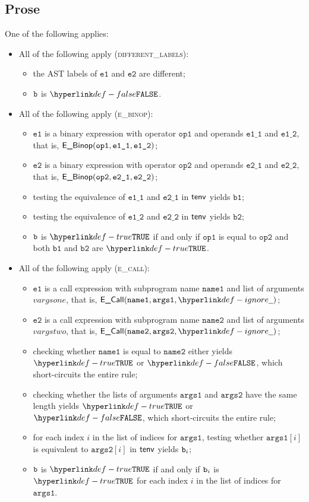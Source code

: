 \documentclass{book}
\newcommand\ProseOrTypeError[0]{\ProseTerminateAs{\TypeErrorConfig}}
\newcommand\veone[0]{\texttt{e1}}
\newcommand\vetwo[0]{\texttt{e2}}
\newcommand\opone[0]{\texttt{op1}}
\newcommand\optwo[0]{\texttt{op2}}
\newcommand\veoneone[0]{\texttt{e1\_1}}
\newcommand\veonetwo[0]{\texttt{e1\_2}}
\newcommand\vetwoone[0]{\texttt{e2\_1}}
\newcommand\vetwotwo[0]{\texttt{e2\_2}}
\newcommand\vbone[0]{\texttt{b1}}
\newcommand\vbtwo[0]{\texttt{b2}}
\newcommand\nameone[0]{\texttt{name1}}
\newcommand\nametwo[0]{\texttt{name2}}
\newcommand\vargsone[0]{\texttt{args1}}
\newcommand\vargstwo[0]{\texttt{args2}}
\begin{document}
\subsection{Prose}
One of the following applies:
\begin{itemize}
  \item All of the following apply (\textsc{different\_labels}):
  \begin{itemize}
    \item the AST labels of $\veone$ and $\vetwo$ are different;
    \item $\texttt{b}$ is $\False$.
  \end{itemize}

  \item All of the following apply (\textsc{e\_binop}):
  \begin{itemize}
    \item $\veone$ is a binary expression with operator $\opone$ and operands $\veoneone$ and $\veonetwo$,
          that is, $\EBinop(\opone, \veoneone, \veonetwo)$;
    \item $\vetwo$ is a binary expression with operator $\optwo$ and operands $\vetwoone$ and $\vetwotwo$,
          that is, $\EBinop(\optwo, \vetwoone, \vetwotwo)$;
    \item testing the equivalence of $\veoneone$ and $\vetwoone$ in $\textsf{tenv}$ yields $\vbone$\ProseOrTypeError;
    \item testing the equivalence of $\veonetwo$ and $\vetwotwo$ in $\textsf{tenv}$ yields $\vbtwo$\ProseOrTypeError;
    \item $\texttt{b}$ is $\True$ if and only if $\opone$ is equal to $\optwo$ and both $\vbone$ and $\vbtwo$ are $\True$.
  \end{itemize}

  \item All of the following apply (\textsc{e\_call}):
  \begin{itemize}
    \item $\veone$ is a call expression with subprogram name $\nameone$ and list of arguments $vargsone$,
          that is, $\ECall(\nameone, \vargsone, \Ignore)$;
    \item $\vetwo$ is a call expression with subprogram name $\nametwo$ and list of arguments $vargstwo$,
          that is, $\ECall(\nametwo, \vargstwo, \Ignore)$;
    \item checking whether $\nameone$ is equal to $\nametwo$ either yields $\True$ or $\False$, which short-circuits the entire rule;
    \item checking whether the lists of arguments $\vargsone$ and $\vargstwo$ have the same length yields
          $\True$ or $\False$, which short-circuits the entire rule;
    \item for each index $i$ in the list of indices for $\vargsone$, testing whether $\vargsone[i]$ is equivalent to $\vargstwo[i]$
          in $\textsf{tenv}$ yields $\texttt{b}_i$\ProseOrTypeError;
    \item $\texttt{b}$ is $\True$ if and only if $\texttt{b}_i$ is $\True$ for each index $i$ in the list of indices for $\vargsone$.
  \end{itemize}


\end{itemize}
\end{document}
